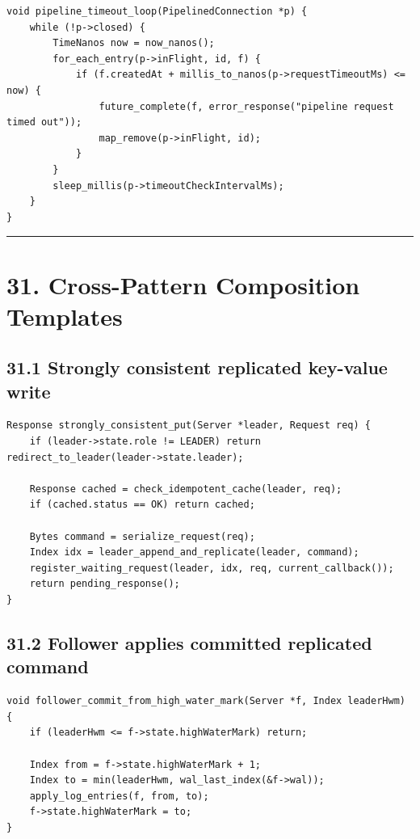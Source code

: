 \documentclass[10pt,letterpaper]{article}
\begin{document}
\begin{verbatim}
void pipeline_timeout_loop(PipelinedConnection *p) {
    while (!p->closed) {
        TimeNanos now = now_nanos();
        for_each_entry(p->inFlight, id, f) {
            if (f.createdAt + millis_to_nanos(p->requestTimeoutMs) <= now) {
                future_complete(f, error_response("pipeline request timed out"));
                map_remove(p->inFlight, id);
            }
        }
        sleep_millis(p->timeoutCheckIntervalMs);
    }
}
\end{verbatim}

\medskip\hrule\medskip

\clearpage
\section*{31. Cross-Pattern Composition Templates}

\subsection*{31.1 Strongly consistent replicated key-value write}

\begin{verbatim}
Response strongly_consistent_put(Server *leader, Request req) {
    if (leader->state.role != LEADER) return redirect_to_leader(leader->state.leader);

    Response cached = check_idempotent_cache(leader, req);
    if (cached.status == OK) return cached;

    Bytes command = serialize_request(req);
    Index idx = leader_append_and_replicate(leader, command);
    register_waiting_request(leader, idx, req, current_callback());
    return pending_response();
}
\end{verbatim}

\subsection*{31.2 Follower applies committed replicated command}

\begin{verbatim}
void follower_commit_from_high_water_mark(Server *f, Index leaderHwm) {
    if (leaderHwm <= f->state.highWaterMark) return;

    Index from = f->state.highWaterMark + 1;
    Index to = min(leaderHwm, wal_last_index(&f->wal));
    apply_log_entries(f, from, to);
    f->state.highWaterMark = to;
}
\end{verbatim}
\end{document}
